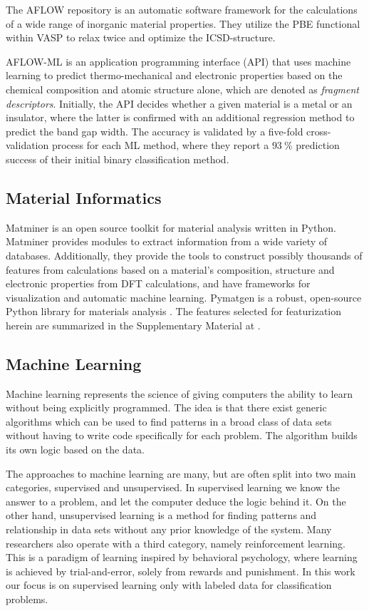 \documentclass[superscriptaddress,unsortedaddress,
 amsmath,amssymb,
 aps,
]{revtex4-2}
\begin{document}
The AFLOW \cite{Curtarolo2012, Curtarolo2012a, Calderon2015} repository is an automatic software framework for the calculations of a wide range of inorganic material properties. They utilize the PBE functional within VASP
to relax twice and optimize the ICSD-structure. 

AFLOW-ML \cite{Isayev2017} is an application programming interface (API) that uses machine learning to predict thermo-mechanical and electronic properties based on the chemical composition and atomic structure alone, which are denoted as \textit{fragment descriptors}. Initially, the API decides whether a given material is a metal or an insulator, where the latter is confirmed with an additional regression method to predict the band gap width. The accuracy is validated by a five-fold cross-validation process for each ML method, where they report a $93 \ \%$ prediction success of their initial binary classification method. 

\subsection*{Material Informatics}  
Matminer \cite{Ward2018} is an open source toolkit for material analysis written in Python. Matminer provides modules to extract information from a wide variety of databases. Additionally, they provide the tools to construct possibly thousands of features from calculations based on a material's composition, structure and electronic properties from DFT calculations, and have frameworks for visualization and automatic machine learning. 
Pymatgen is a robust, open-source Python library for materials analysis \cite{pymatgen}.
The features selected for featurization herein are summarized in the Supplementary Material at \cite{supplementary}. 

\subsection*{Machine Learning} 

Machine learning represents the science of giving computers the ability to learn without being explicitly programmed. The idea is that there exist generic algorithms which can be used to find patterns in a broad class of data sets without having to write code specifically for each problem. The algorithm builds its own logic based on the data. 

The approaches to machine learning are many, but are often split into two main categories, supervised and unsupervised. In supervised learning we know the answer to a problem, and let the computer deduce the logic behind it. On the other hand, unsupervised learning is a method for finding patterns and relationship in data sets without any prior knowledge of the system. Many researchers also operate with a third category, namely reinforcement learning. This is a paradigm of learning inspired by behavioral psychology, where learning is achieved by trial-and-error, solely from rewards and punishment. In this work our focus is on supervised learning only with labeled data for classification problems.
\end{document}
